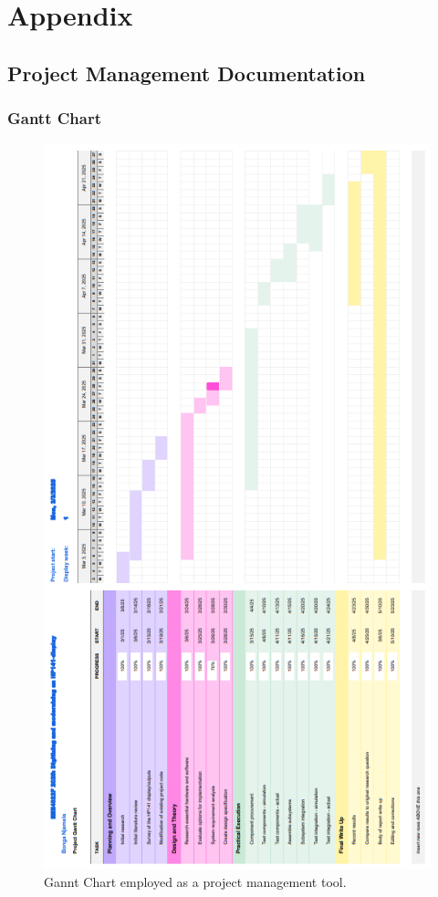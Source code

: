 \documentclass[class=report,11pt,crop=false]{standalone}
\begin{document}
	\chapter{Appendix}

	\section{Project Management Documentation}
	
	\subsection{Gantt Chart}
	\begin{figure}[ht!]
		\centering
		\includegraphics[width=0.50\linewidth]{Figures/Appendices/gantt-chart}
		\caption{Gannt Chart employed as a project management tool.}
		\label{fig:project-gannt}
	\end{figure} 
	\clearpage
\end{document}

